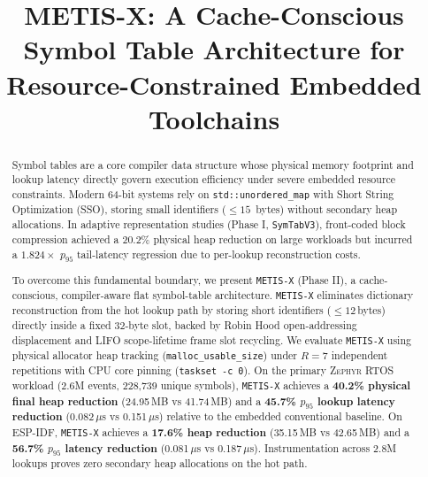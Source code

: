 \documentclass[conference]{IEEEtran}
\begin{document}
\title{METIS-X: A Cache-Conscious Symbol Table Architecture for Resource-Constrained Embedded Toolchains}

\author{
\and
{}
\and
{}
}

\maketitle

\begin{abstract}
Symbol tables are a core compiler data structure whose physical memory footprint and lookup latency directly govern execution efficiency under severe embedded resource constraints. Modern 64-bit systems rely on \texttt{std::unordered\_map} with Short String Optimization (SSO), storing small identifiers ($\le 15$~bytes) without secondary heap allocations. In adaptive representation studies (Phase I, \texttt{SymTabV3}), front-coded block compression achieved a 20.2\% physical heap reduction on large workloads but incurred a $1.824\times$ $p_{95}$ tail-latency regression due to per-lookup reconstruction costs.

To overcome this fundamental boundary, we present \texttt{METIS-X} (Phase II), a cache-conscious, compiler-aware flat symbol-table architecture. \texttt{METIS-X} eliminates dictionary reconstruction from the hot lookup path by storing short identifiers ($\le 12$\,bytes) directly inside a fixed 32-byte slot, backed by Robin Hood open-addressing displacement and LIFO scope-lifetime frame slot recycling. We evaluate \texttt{METIS-X} using physical allocator heap tracking (\texttt{malloc\_usable\_size}) under $R=7$ independent repetitions with CPU core pinning (\texttt{taskset -c 0}). On the primary \textsc{Zephyr} RTOS workload (2.6M events, 228,739 unique symbols), \texttt{METIS-X} achieves a \textbf{40.2\% physical final heap reduction} (24.95\,MB vs 41.74\,MB) and a \textbf{45.7\% $p_{95}$ lookup latency reduction} (0.082\,$\mu$s vs 0.151\,$\mu$s) relative to the embedded conventional baseline. On \textsc{ESP-IDF}, \texttt{METIS-X} achieves a \textbf{17.6\% heap reduction} (35.15\,MB vs 42.65\,MB) and a \textbf{56.7\% $p_{95}$ latency reduction} (0.081\,$\mu$s vs 0.187\,$\mu$s). Instrumentation across 2.8M lookups proves zero secondary heap allocations on the hot path.
\end{abstract}
\end{document}
